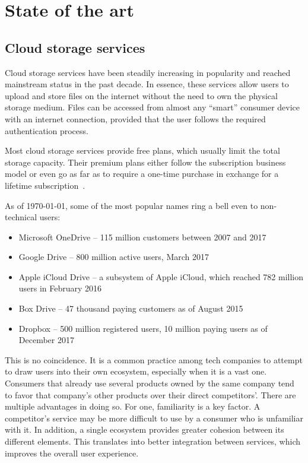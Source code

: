 \chapter{State of the art}\label{state_of_the_art}

\section{Cloud storage services} \label{cloud_storage_services}

Cloud storage services have been steadily increasing in popularity and reached mainstream status in the past decade. In essence, these services allow users to upload and store files on the internet without the need to own the physical storage medium. Files can be accessed from almost any ``smart'' consumer device with an internet connection, provided that the user follows the required authentication process.

Most cloud storage services provide free plans, which usually limit the total storage capacity. Their premium plans either follow the subscription business model or even go as far as to require a one-time purchase in exchange for a lifetime subscription~\cite{get_3tb_of_lifetime_cloud_storage}.

As of \monthyeardate\today, some of the most popular names ring a bell even to non-technical users:
\begin{itemize} \label{lst:cloud_storage_services}
\itemsep0em
\item Microsoft OneDrive -- 115 million customers between 2007 and 2017~\cite{10_years_of_onedrive}
\item Google Drive -- 800 million active users, March 2017~\cite{google_plans_to_leverage,google_updates_drive_focus_on_business}
\item Apple iCloud Drive -- a subsystem of Apple iCloud, which reached 782 million users in February 2016~\cite{icloud_hits_782m_users}
\item Box Drive -- 47 thousand paying customers as of August 2015~\cite{box_hires_nasdaq_exec}
\item Dropbox -- 500 million registered users, 10 million paying users as of December 2017~\cite{dropbox_inc_registration_statement}
\end{itemize}

This is no coincidence. It is a common practice among tech companies to attempt to draw users into their own ecosystem, especially when it is a vast one. Consumers that already use several products owned by the same company tend to favor that company's other products over their direct competitors'. There are multiple advantages in doing so. For one, familiarity is a key factor. A competitor's service may be more difficult to use by a consumer who is unfamiliar with it. In addition, a single ecosystem provides greater cohesion between its different elements. This translates into better integration between services, which improves the overall user experience.

